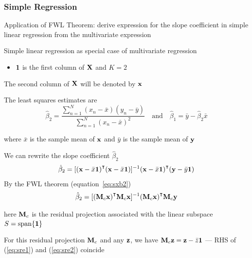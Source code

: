 \begin{frame}\frametitle{Simple Regression}

    \vspace{2em}
    Application of FWL Theorem: derive expression for the slope coefficient 
    in simple linear regression from the multivariate expression
    
    \vspace{.7em}
    Simple linear regression as special case of multivariate regression
    \begin{itemize}
        \item ${\mathbf 1}$ is the first column of $\mathbf X$ and $K = 2$
    \end{itemize}
    
    The second column of $\mathbf X$ will be denoted by ${\mathbf x}$
    
    The least squares estimates are
    \begin{equation*}
        \hat \beta_2 = \frac{\sum_{n=1}^N (x_n - \bar x)(y_n - \bar y)}
                        {\sum_{n=1}^N (x_n - \bar x)^2}
        \quad \text{and} \quad
        \hat \beta_1 = \bar y - \hat \beta_2 \bar x
    \end{equation*}
    
    where $\bar x$ is the sample mean of ${\mathbf x}$ and $\bar y$ is 
    the sample mean of ${\mathbf y}$
    
\end{frame}

\begin{frame}

    \vspace{2em}
    We can rewrite the slope coefficient $\hat \beta_2$
    \begin{equation}
    \label{eq:sre1}
    \hat \beta_2 = 
    [(\boldx - \bar x \boldone)^\T(\boldx - \bar x \boldone)]^{-1}
    (\boldx - \bar x \boldone)^\T(\boldy - \bar y \boldone)
    \end{equation}
    By the FWL theorem (equation~\ref{eq:sxb2})
    \begin{equation}
        \label{eq:sre2}
        \hat \beta_2 
            = [(\boldM_c\boldx)^\T \boldM_c \boldx]^{-1} (\boldM_c \boldx)^\T \boldM_c \boldy
    \end{equation}

    here $\mathbf M_c$ is the residual projection associated with the linear
    subspace $S = \operatorname{span}\{{\mathbf 1}\}$
    
    \vspace{.7em}
    For this residual projection $\mathbf M_c$ and any ${\mathbf z}$,
    we have $\mathbf M_c {\mathbf z} = {\mathbf z} - \bar z {\mathbf 1}$ --- RHS of
    (\ref{eq:sre1}) and (\ref{eq:sre2}) coincide
    
\end{frame}

